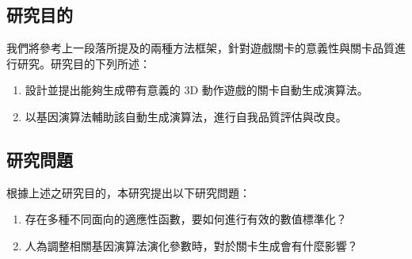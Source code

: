 \subsection{研究目的}

我們將參考上一段落所提及的兩種方法框架，針對遊戲關卡的意義性與關卡品質進行研究。研究目的下列所述：

\begin{enumerate}
  \setlength\itemsep{-0.5em}
  \item 設計並提出能夠生成帶有意義的 3D 動作遊戲的關卡自動生成演算法。
  \item 以基因演算法輔助該自動生成演算法，進行自我品質評估與改良。
\end{enumerate}

\subsection{研究問題}

根據上述之研究目的，本研究提出以下研究問題：

\begin{enumerate}
  \setlength\itemsep{-0.5em}
  \item 存在多種不同面向的適應性函數，要如何進行有效的數值標準化？
  \item 人為調整相關基因演算法演化參數時，對於關卡生成會有什麼影響？
\end{enumerate}






